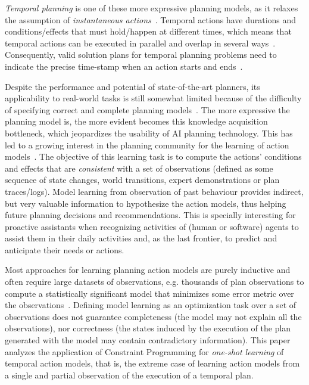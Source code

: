 \documentclass[runningheads]{llncs}
\begin{document}
{\em Temporal planning} is one of these more expressive planning models, as it relaxes the assumption of {\em instantaneous actions}~\cite{fox2003pddl2}. Temporal actions have durations and conditions/effects that must hold/happen at different times, which means that temporal actions can be executed in parallel and overlap in several ways~\cite{cushing2007temporal}. Consequently, valid solution plans for temporal planning problems need to indicate the precise time-stamp when an action starts and ends~\cite{howey2004val}.

Despite the performance and potential of state-of-the-art planners, its applicability to real-world tasks is still somewhat limited because of the difficulty of specifying correct and complete planning models~\cite{kambhampati2007model}. The more expressive the planning model is, the more evident becomes this knowledge acquisition bottleneck, which jeopardizes the usability of AI planning technology. This has led to a growing interest in the planning community for the learning of action models~\cite{jimenez2012review}. The objective of this learning task is to compute the actions' conditions and effects that are {\em consistent} with a set of observations (defined as some sequence of state changes, world transitions, expert demonstrations or plan traces/logs). Model learning from observation of past behaviour provides indirect, but very valuable information to hypothesize the action models, thus helping future planning decisions and recommendations. This is specially interesting for proactive assistants when recognizing activities of (human or software) agents to assist them in their daily activities and, as the last frontier, to predict and anticipate their needs or actions.

Most approaches for learning planning action models are purely inductive and often require large datasets of observations, e.g. thousands of plan observations to compute a statistically significant model that minimizes some error metric over the observations~\cite{kuvcera2018louga,MouraoZPS12,yang2007learning,zhuo2013action}. Defining model learning as an optimization task over a set of observations does not guarantee completeness (the model may not explain all the observations), nor correctness (the states induced by the execution of the plan generated with the model may contain contradictory information). This paper analyzes the application of Constraint Programming for {\em one-shot learning} of temporal action models, that is, the extreme case of learning action models from a single and partial observation of the execution of a temporal plan.
\end{document}
